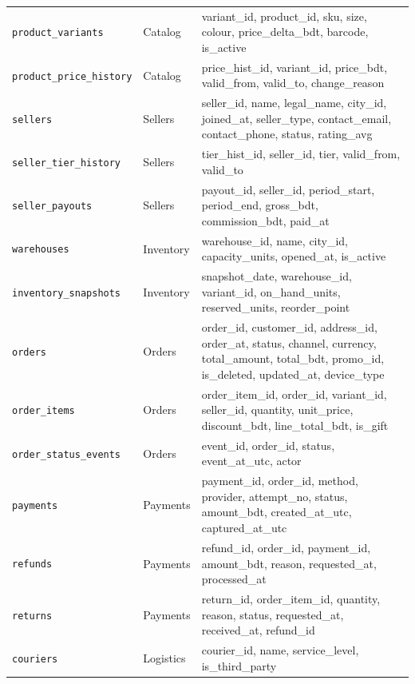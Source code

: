 \documentclass[11pt,a4paper]{article}
\newcommand{\code}[1]{\texttt{\small #1}}
\begin{document}
{\begin{longtable}{@{}l l >{\raggedright\arraybackslash}p{9.3cm}@{}}
\code{product\_variants} & Catalog & \footnotesize\ttfamily variant\_id, product\_id, sku, size, colour, price\_delta\_bdt, barcode, is\_active\\
\code{product\_price\_history} & Catalog & \footnotesize\ttfamily price\_hist\_id, variant\_id, price\_bdt, valid\_from, valid\_to, change\_reason\\
\code{sellers} & Sellers & \footnotesize\ttfamily seller\_id, name, legal\_name, city\_id, joined\_at, seller\_type, \textcolor{bad}{contact\_email}, \textcolor{bad}{contact\_phone}, status, rating\_avg\\
\code{seller\_tier\_history} & Sellers & \footnotesize\ttfamily tier\_hist\_id, seller\_id, tier, valid\_from, valid\_to\\
\code{seller\_payouts} & Sellers & \footnotesize\ttfamily payout\_id, seller\_id, period\_start, period\_end, gross\_bdt, commission\_bdt, paid\_at\\
\code{warehouses} & Inventory & \footnotesize\ttfamily warehouse\_id, name, city\_id, capacity\_units, opened\_at, is\_active\\
\code{inventory\_snapshots} & Inventory & \footnotesize\ttfamily snapshot\_date, warehouse\_id, variant\_id, on\_hand\_units, reserved\_units, reorder\_point\\
\code{orders} & Orders & \footnotesize\ttfamily order\_id, customer\_id, address\_id, order\_at, status, channel, currency, total\_amount, total\_bdt, promo\_id, is\_deleted, updated\_at, device\_type\\
\code{order\_items} & Orders & \footnotesize\ttfamily order\_item\_id, order\_id, variant\_id, seller\_id, quantity, unit\_price, discount\_bdt, line\_total\_bdt, is\_gift\\
\code{order\_status\_events} & Orders & \footnotesize\ttfamily event\_id, order\_id, status, event\_at\_utc, actor\\
\code{payments} & Payments & \footnotesize\ttfamily payment\_id, order\_id, method, provider, attempt\_no, status, amount\_bdt, created\_at\_utc, captured\_at\_utc\\
\code{refunds} & Payments & \footnotesize\ttfamily refund\_id, order\_id, payment\_id, amount\_bdt, reason, requested\_at, processed\_at\\
\code{returns} & Payments & \footnotesize\ttfamily return\_id, order\_item\_id, quantity, reason, status, requested\_at, received\_at, refund\_id\\
\code{couriers} & Logistics & \footnotesize\ttfamily courier\_id, name, service\_level, is\_third\_party\\

\end{longtable}}
\end{document}
